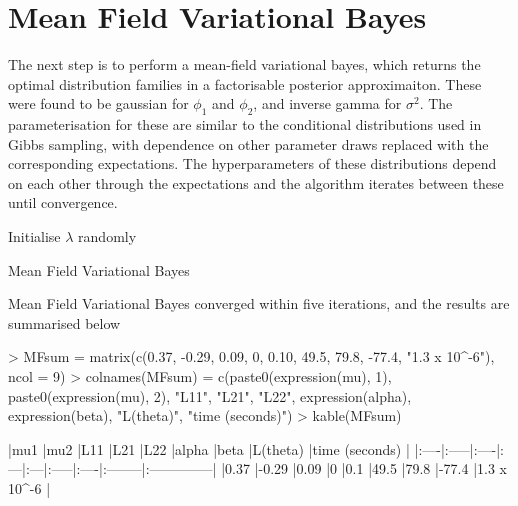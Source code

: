 \documentclass{article}
\begin{document}
\section{Mean Field Variational Bayes}
The next step is to perform a mean-field variational bayes, which returns the optimal distribution families in a factorisable posterior approximaiton. 
These were found to be gaussian for $\phi_1$ and $\phi_2$, and inverse gamma for $\sigma^2$. The parameterisation for these are similar to the conditional distributions used in Gibbs sampling, with dependence on other parameter draws replaced with the corresponding expectations. The hyperparameters of these distributions depend on each other through the expectations and the algorithm iterates between these until convergence.

\begin{algorithm}[H]
 Initialise $\lambda$ randomly\;
 \caption{Mean Field Variational Bayes}
\end{algorithm}

Mean Field Variational Bayes converged within five iterations, and the results are summarised below

\begin{Schunk}
\begin{Sinput}
> MFsum = matrix(c(0.37, -0.29, 0.09, 0, 0.10, 49.5, 79.8, -77.4, "1.3 x 10^{-6}"), ncol = 9)
> colnames(MFsum) = c(paste0(expression(mu), 1), paste0(expression(mu), 2), "L11", "L21", "L22", expression(alpha), expression(beta), "L(theta)", "time (seconds)")
> kable(MFsum)
\end{Sinput}
\begin{Soutput}
|mu1  |mu2   |L11  |L21 |L22 |alpha |beta |L(theta) |time (seconds) |
|:----|:-----|:----|:---|:---|:-----|:----|:--------|:--------------|
|0.37 |-0.29 |0.09 |0   |0.1 |49.5  |79.8 |-77.4    |1.3 x 10^{-6}  |
\end{Soutput}
\end{Schunk}
\end{document}
